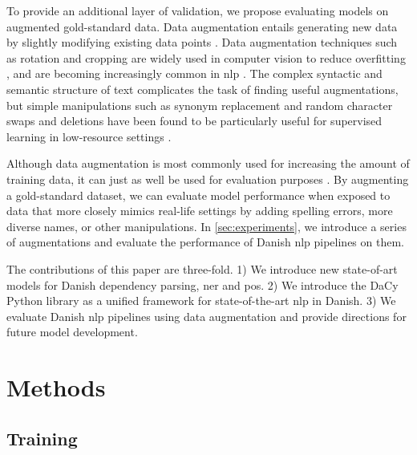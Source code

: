 \documentclass{article}
\begin{document}
To provide an additional layer of validation, we propose evaluating models on augmented gold-standard data. Data augmentation entails generating new data by slightly modifying existing data points \parencite{feng_survey_2021}. Data augmentation techniques such as rotation and cropping are widely used in computer vision to reduce overfitting \parencite{shorten_survey_2019}, and are becoming increasingly common in \gls{nlp} \parencite{chen_empirical_2021}. The complex syntactic and semantic structure of text complicates the task of finding useful augmentations, but simple manipulations such as synonym replacement and random character swaps and deletions have been found to be particularly useful for supervised learning in low-resource settings \parencite{wei_eda_2019}.

Although data augmentation is most commonly used for increasing the amount of training data, it can just as well be used for evaluation purposes \parencite{ribeiro_beyond_2020}. By augmenting a gold-standard dataset, we can evaluate model performance when exposed to data that more closely mimics real-life settings by adding spelling errors, more diverse names, or other manipulations. In \cref{sec:experiments}, we introduce a series of augmentations and evaluate the performance of Danish \gls{nlp} pipelines on them. 

The contributions of this paper are three-fold. 1) We introduce new state-of-art models for Danish dependency parsing, \gls{ner} and \gls{pos}. 2) We introduce the DaCy Python library as a unified framework for state-of-the-art \gls{nlp} in Danish. 3) We evaluate Danish \gls{nlp} pipelines using data augmentation and provide directions for future model development.
 
\section{Methods}

\subsection{Training}
\end{document}
